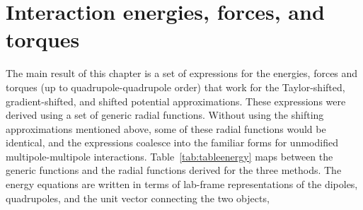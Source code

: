 \section{Interaction energies, forces, and torques}
The main result of this chapter is a set of expressions for the
energies, forces and torques (up to quadrupole-quadrupole order) that
work for the Taylor-shifted, gradient-shifted, and shifted potential
approximations.  These expressions were derived using a set of generic
radial functions.  Without using the shifting approximations mentioned
above, some of these radial functions would be identical, and the
expressions coalesce into the familiar forms for unmodified
multipole-multipole interactions.  Table~\ref{tab:tableenergy} maps
between the generic functions and the radial functions derived for the
three methods.  The energy equations are written in terms of lab-frame
representations of the dipoles, quadrupoles, and the unit vector
connecting the two objects,

